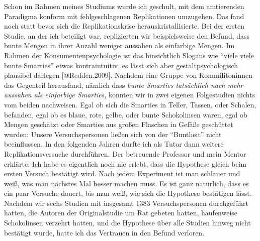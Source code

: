 \documentclass[
  letterpaper,
  DIV=11,
  numbers=noendperiod]{scrreprt}
\begin{document}
\begin{tcolorbox}[enhanced jigsaw, bottomrule=.15mm, toprule=.15mm, opacitybacktitle=0.6, breakable, colback=white, coltitle=black, bottomtitle=1mm, toptitle=1mm, titlerule=0mm, title=\textcolor{quarto-callout-tip-color}{\faLightbulb}\hspace{0.5em}{Beim ersten Versuch klappt es nie: Paradigmenwechsel in der Psychologie}, rightrule=.15mm, arc=.35mm, opacityback=0, leftrule=.75mm, left=2mm, colbacktitle=quarto-callout-tip-color!10!white, colframe=quarto-callout-tip-color-frame]

Schon im Rahmen meines Studiums wurde ich geschult, mit dem amtierenden
Paradigma konform mit fehlgeschlagenen Replikationen umzugehen. Das fand
noch statt bevor sich die Replikationskrise herauskristallisierte. Bei
der ersten Studie, an der ich beteiligt war, replizierten wir
beispielsweise den Befund, dass bunte Mengen in ihrer Anzahl weniger
aussahen als einfarbige Mengen. Im Rahmen der Konsumentenpsychologie ist
das hinsichtlich Slogans wie ``viele viele bunte Smarties'' etwas
kontraintuitiv, es lässt sich aber gestaltpsychologisch plausibel
darlegen {[}@Redden.2009{]}. Nachdem eine Gruppe von Kommilitoninnen das
Gegenteil herausfand, nämlich dass \emph{bunte Smarties tatsächlich nach
mehr aussahen als einfarbige Smarties}, konnten wir in zwei eigenen
Folgestudien nichts vom beiden nachweisen. Egal ob sich die Smarties in
Teller, Tassen, oder Schalen, befanden, egal ob es blaue, rote, gelbe,
oder bunte Schokolinsen waren, egal ob Mengen geschätzt oder Smarties
aus großen Flaschen in Gefäße geschüttet wurden: Unsere Versuchspersonen
ließen sich von der ``Buntheit'' nicht beeinflussen. In den folgenden
Jahren durfte ich als Tutor dann weitere Replikationsversuche
durchführen. Der betreuende Professor und mein Mentor erklärte: Ich habe
es eigentlich noch nie erlebt, dass die Hypothese gleich beim ersten
Versuch bestätigt wird. Nach jedem Experiment ist man schlauer und weiß,
was man nächstes Mal besser machen muss. Es ist ganz natürlich, dass es
ein paar Versuche dauert, bis man weiß, wie sich die Hypothese
bestätigen lässt. Nachdem wir sechs Studien mit insgesamt 1383
Versuchspersonen durchgeführt hatten, die Autoren der Originalstudie um
Rat gebeten hatten, haufenweise Schokolinsen verzehrt hatten, und die
Hypothese über alle Studien hinweg nicht bestätigt wurde, hatte ich das
Vertrauen in den Befund verloren.


\end{tcolorbox}
\end{document}
